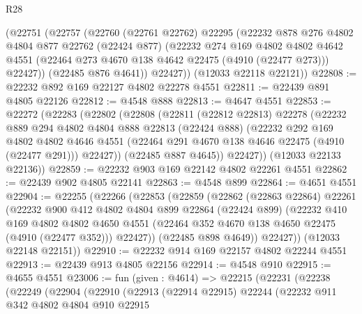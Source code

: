 \begin{lexlean}{R28}
\begin{coremodule}
      (@22751
        (@22757
          (@22760
            (@22761 @22762)
            @22295
            (@22232
              @878
              @276
              @4802
              @4804
              @877
              @22762
              (@22424 @877)
              (@22232
                @274
                @169
                @4802
                @4802
                @4642
                @4551
                (@22464 @273 @4670 @138 @4642 @22475 (@4910 (@22477 @273)))
                @22427))
            (@22485 @876 @4641))
          @22427))
      (@12033 @22118 @22121))
@22808 := @22232 @892 @169 @22127 @4802 @22278 @4551
@22811 := @22439 @891 @4805 @22126
@22812 := @4548 @888
@22813 := @4647 @4551
@22853 := @22272
    (@22283
      (@22802
        (@22808
          (@22811
            (@22812 @22813)
            @22278
            (@22232
              @889
              @294
              @4802
              @4804
              @888
              @22813
              (@22424 @888)
              (@22232
                @292
                @169
                @4802
                @4802
                @4646
                @4551
                (@22464 @291 @4670 @138 @4646 @22475 (@4910 (@22477 @291)))
                @22427))
            (@22485 @887 @4645))
          @22427))
      (@12033 @22133 @22136))
@22859 := @22232 @903 @169 @22142 @4802 @22261 @4551
@22862 := @22439 @902 @4805 @22141
@22863 := @4548 @899
@22864 := @4651 @4551
@22904 := @22255
    (@22266
      (@22853
        (@22859
          (@22862
            (@22863 @22864)
            @22261
            (@22232
              @900
              @412
              @4802
              @4804
              @899
              @22864
              (@22424 @899)
              (@22232
                @410
                @169
                @4802
                @4802
                @4650
                @4551
                (@22464 @352 @4670 @138 @4650 @22475 (@4910 (@22477 @352)))
                @22427))
            (@22485 @898 @4649))
          @22427))
      (@12033 @22148 @22151))
@22910 := @22232 @914 @169 @22157 @4802 @22244 @4551
@22913 := @22439 @913 @4805 @22156
@22914 := @4548 @910
@22915 := @4655 @4551
@23006 := fun (given : @4614) =>
  @22215
    (@22231
      (@22238
        (@22249
          (@22904
            (@22910
              (@22913
                (@22914 @22915)
                @22244
                (@22232
                  @911
                  @342
                  @4802
                  @4804
                  @910
                  @22915

\end{coremodule}
\end{lexlean}
